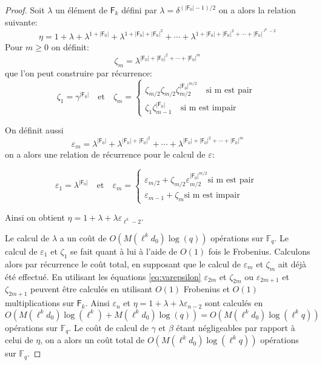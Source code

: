 \documentclass[10pt,a4paper]{book}
\theoremstyle{plain}
\theoremstyle{definition}
\theoremstyle{definition}
\theoremstyle{definition}
\theoremstyle{definition}
\theoremstyle{remark}
\theoremstyle{remark}
\theoremstyle{definition}
\begin{document}
\begin{proof}
Soit $\lambda$ un élément de $\mathsf{F}_k$ défini par $\lambda = \delta^{(|\mathsf{F}_0|-1)/2} $ on a alors la relation suivante:
\begin{equation*}
\eta = 1 + \lambda + \lambda^{1+|\mathsf{F}_0|} + \lambda^{1+|\mathsf{F}_0|+|\mathsf{F}_0|^{2}} + \cdots + \lambda^{1+|\mathsf{F}_0|+|\mathsf{F}_0|^{2}+\cdots+|\mathsf{F}_0|^{\ell^k-2}} 
\end{equation*}
Pour $m \geqslant 0$ on définit:
\begin{equation}
\zeta_m=\lambda^{|\mathsf{F}_0|+|\mathsf{F}_0|^2+\cdots+|\mathsf{F}_0|^{m}} 
\end{equation}
que l'on peut construire par récurrence:
\begin{equation*}
\zeta_1=\gamma^{|\mathsf{F}_0|} \quad \text{et} \quad
\zeta_m=
\begin{cases} 
\zeta_{m/2}  \zeta_{m/2}\zeta_{m/2}^{|\mathsf{F}_0|^{m/2}} \quad \text{si m est pair }\\
\zeta_{1}  \zeta_{m-1}^{|\mathsf{F}_0|} \quad \text{si m est impair}
\end{cases}
\end{equation*}

On définit aussi
\begin{equation*}
\varepsilon_m=\lambda^{|\mathsf{F}_0|} + \lambda^{|\mathsf{F}_0|+|\mathsf{F}_0|^{2}} + \cdots + \lambda^{|\mathsf{F}_0|+|\mathsf{F}_0|^{2}+\cdots+|\mathsf{F}_0|^{m}}
\end{equation*} 
on a alors une relation de récurrence pour le calcul de $\varepsilon$:

\begin{equation}
\label{eq:varepsilon}
\varepsilon_1=\lambda^{|\mathsf{F}_0|} \quad \text{et} \quad
\varepsilon_m=
\begin{cases} 
\varepsilon_{m/2} + \zeta_{m/2}\varepsilon_{m/2}^{|\mathsf{F}_0|^{m/2}} \text{si m est pair }\\
\varepsilon_{m-1} + \zeta_{m} \text{si m est impair}
\end{cases}
\end{equation}

Ainsi on obtient $\eta=1+\lambda+\lambda \varepsilon_{\ell^k-2}$. 

 
Le calcul de $\lambda$ a un coût de $O(M(\ell^kd_0)\log(q))$ opérations sur $\mathbb{F}_q$. Le calcul de $\varepsilon_1$ et $\zeta_1$ se fait quant à lui à l'aide de $O(1)$ fois le Frobenius. Calculons alors par récurrence le coût total, en supposant que le calcul de $\varepsilon_m$ et $\zeta_m$ ait déjà été effectué. En utilisant les équations \eqref{eq:varepsilon} $\varepsilon_{2m}$ et $\zeta_{2m}$ ou $\varepsilon_{2m+1}$ et $\zeta_{2m+1}$ peuvent être calculés en utilisant $O(1)$ Frobenius et $O(1)$ multiplications sur $\mathsf{F}_{k}$. Ainsi $\varepsilon_n$ et $\eta=1+\lambda+\lambda\varepsilon_{n-2}$ sont calculés en $O(M(\ell^kd_0)\log(\ell^k)+M(\ell^kd_0)\log(q))=O(M(\ell^kd_0)\log(\ell^kq))$ opérations sur $\mathbb{F}_q$.
Le coût de calcul de $\gamma$ et $\beta$ étant négligeables par rapport à celui de $\eta$, on a alors un coût total de $O(M(\ell^kd_0)\log(\ell^kq))$ opérations sur $\mathbb{F}_q$.

\end{proof}
\end{document}

